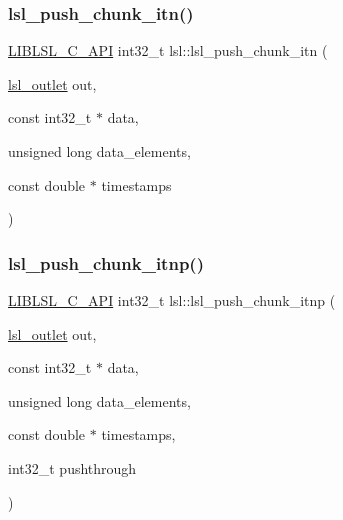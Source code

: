 \subsubsection{\texorpdfstring{lsl\+\_\+push\+\_\+chunk\+\_\+itn()}{lsl\_push\_chunk\_itn()}}
{\footnotesize\ttfamily \hyperlink{lsl__cpp_8h_aafd0ef1813e8be84a1420c4f1df64615}{L\+I\+B\+L\+S\+L\+\_\+\+C\+\_\+\+A\+PI} int32\+\_\+t lsl\+::lsl\+\_\+push\+\_\+chunk\+\_\+itn (\begin{DoxyParamCaption}\item[{\hyperlink{namespacelsl_abcf512b0f66dacf86c10b165995fd50b}{lsl\+\_\+outlet}}]{out,  }\item[{const int32\+\_\+t $\ast$}]{data,  }\item[{unsigned long}]{data\+\_\+elements,  }\item[{const double $\ast$}]{timestamps }\end{DoxyParamCaption})}

\mbox{\label{namespacelsl_a9102a7929e172f9a42e51211139d691f}} 
\subsubsection{\texorpdfstring{lsl\+\_\+push\+\_\+chunk\+\_\+itnp()}{lsl\_push\_chunk\_itnp()}}
{\footnotesize\ttfamily \hyperlink{lsl__cpp_8h_aafd0ef1813e8be84a1420c4f1df64615}{L\+I\+B\+L\+S\+L\+\_\+\+C\+\_\+\+A\+PI} int32\+\_\+t lsl\+::lsl\+\_\+push\+\_\+chunk\+\_\+itnp (\begin{DoxyParamCaption}\item[{\hyperlink{namespacelsl_abcf512b0f66dacf86c10b165995fd50b}{lsl\+\_\+outlet}}]{out,  }\item[{const int32\+\_\+t $\ast$}]{data,  }\item[{unsigned long}]{data\+\_\+elements,  }\item[{const double $\ast$}]{timestamps,  }\item[{int32\+\_\+t}]{pushthrough }\end{DoxyParamCaption})}

\mbox{\label{namespacelsl_a38439e357a8d6c984ffcfd9e22596ec1}} 
